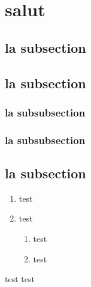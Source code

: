 \documentclass{classe-tex3R-2-1}
\begin{document}
\logoactif



\section{salut}

\subsection{la subsection}

\subsection{la subsection}

\subsubsection{la subsubsection}

\subsubsection{la subsubsection}

\subsection{la subsection}


\titreactif








\begin{enumerate}
  \item test
  \item test
  \begin{enumerate}
    \item test
    \item test
  \end{enumerate}
\end{enumerate}


\begin{tasks}[style=enumerate]
  \task test
  \task test
\end{tasks}
\end{document}
